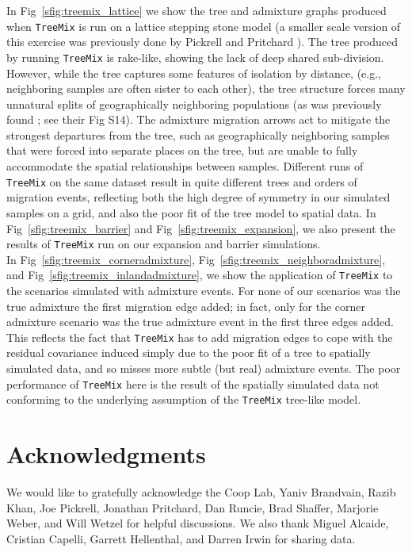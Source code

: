 \documentclass[10pt,letterpaper]{article}
\begin{document}
In Fig\ \ref{sfig:treemix_lattice} we show the tree and admixture graphs produced when
\texttt{TreeMix} is run on a lattice stepping stone model 
(a smaller scale version of this exercise was previously done by Pickrell and Pritchard \cite{Treemix}). 
The tree produced by running \texttt{TreeMix} is rake-like, showing the lack of deep shared sub-division. 
However, while the tree captures some features of isolation by distance, 
(e.g., neighboring samples are often sister to each other), 
the tree structure forces many unnatural splits of geographically neighboring populations 
(as was previously found \cite{Treemix}; see their Fig S14). 
The admixture migration arrows act to mitigate the strongest departures from the tree, 
such as geographically neighboring samples that were forced into separate places on the tree,
but are unable to fully accommodate the spatial relationships between samples. 
 Different runs of \texttt{TreeMix} on the same dataset result in quite different trees and orders of migration events, 
 reflecting both the high degree of symmetry in our simulated samples on a grid, 
 and also the poor fit of the tree model to spatial data. 
In Fig\ \ref{sfig:treemix_barrier} and Fig\ \ref{sfig:treemix_expansion},
we also present the results of \texttt{TreeMix} run on our expansion and barrier simulations.\\

In Fig\ \ref{sfig:treemix_corneradmixture}, Fig\ \ref{sfig:treemix_neighboradmixture}, and Fig\ \ref{sfig:treemix_inlandadmixture},
we show the application of \texttt{TreeMix} to the scenarios simulated with admixture events.  
For none of our scenarios was the true admixture the first migration edge added; 
in fact, only for the corner admixture scenario was the true admixture
event in the first three edges added. 
This reflects the fact that \texttt{TreeMix} has to add migration edges to cope with the residual
covariance induced simply due to the poor fit of a tree to spatially simulated data,
and so misses more subtle (but real) admixture events.
The poor performance of \texttt{TreeMix} here is the result of the 
spatially simulated data not conforming to the 
underlying assumption of the \texttt{TreeMix} tree-like model.

\section*{Acknowledgments}
We would like to gratefully acknowledge the Coop Lab, Yaniv Brandvain, Razib Khan, Joe Pickrell, 
Jonathan Pritchard, Dan Runcie, Brad Shaffer, Marjorie Weber, and Will Wetzel for helpful discussions.  
We also thank Miguel Alcaide, Cristian Capelli, Garrett Hellenthal, and Darren Irwin for sharing data.
\end{document}
